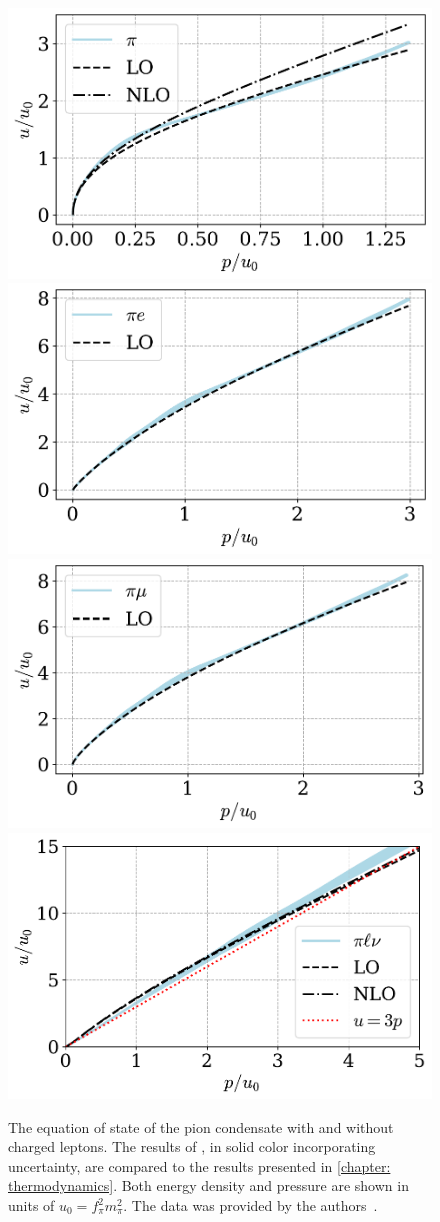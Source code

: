 \begin{figure}[p]
    \centering
    \includegraphics[width=.46\textwidth]{../scripts/figurer/brandt_eos.pdf}
    \includegraphics[width=.46\textwidth]{../scripts/figurer/brandt_eos_e.pdf}
    \hspace{2mm}
    \includegraphics[width=.46\textwidth]{../scripts/figurer/brandt_eos_mu.pdf}
    \includegraphics[width=.48\textwidth]{../scripts/figurer/brandt_eos_neutrino.pdf}
    \caption{
        The equation of state of the pion condensate with and without charged leptons.
        The results of \citeauthor{brandtNewClassCompact2018}, in solid color incorporating uncertainty, are compared to the results presented in \autoref{chapter: thermodynamics}.
        Both energy density and pressure are shown in units of $u_0 = f_\pi^2 m_\pi^2$.
        The data was provided by the authors~\autocite{brandtNewClassCompact2018}.
    }
    \label{fig: brandt eos}
\end{figure}

